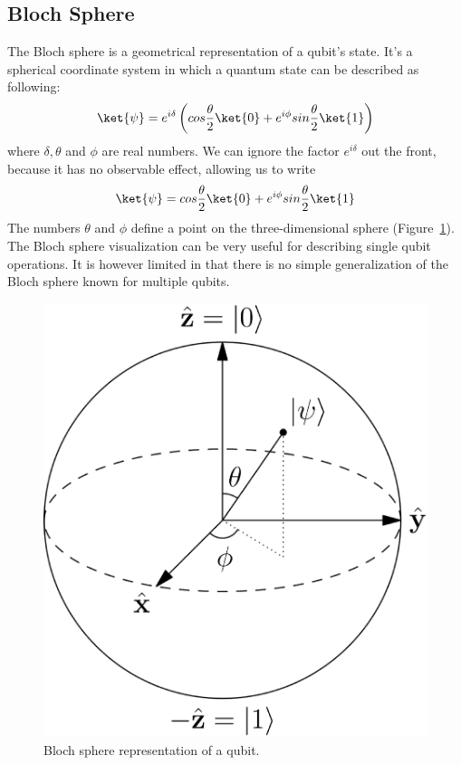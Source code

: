 \documentclass[11pt]{article}
\begin{document}
\subsection{Bloch Sphere}
The Bloch sphere is a geometrical representation of a qubit's state. It's a spherical coordinate system in which a quantum state can be described as following:
\[
  \ket{\psi} = e^{i\delta} \left(cos\dfrac{\theta}{2}\ket{0} + e^{i\phi}sin\dfrac{\theta}{2}\ket{1}\right)
\]
where $\delta, \theta$ and $\phi$ are real numbers. We can ignore the factor $e^{i\delta}$ out the front, because it has no observable effect, allowing us to write
\[
  \ket{\psi} = cos\dfrac{\theta}{2}\ket{0} + e^{i\phi}sin\dfrac{\theta}{2}\ket{1}
\]
The numbers $\theta$ and $\phi$ define a point on the three-dimensional sphere (Figure~\ref{fig:bloch}). The Bloch sphere visualization can be very useful for describing single qubit operations. It is however limited in that there is no simple generalization of the Bloch sphere known for multiple qubits.
\begin{figure}[ht]
  \centering
  \includegraphics[scale=0.2]{images/bloch_sphere.eps}
  \caption{Bloch sphere representation of a qubit.}
  \label{fig:bloch}
\end{figure}
\par
\newpage
\end{document}
